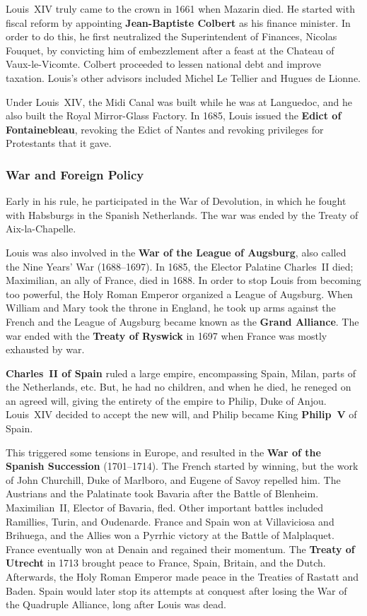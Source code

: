 Louis~XIV truly came to the crown in 1661 when Mazarin died.
He started with fiscal reform by appointing \textbf{Jean-Baptiste Colbert} as his finance minister.
In order to do this, he first neutralized the Superintendent of Finances, Nicolas Fouquet,
by convicting him of embezzlement after a feast at the Chateau of Vaux-le-Vicomte.
Colbert proceeded to lessen national debt and improve taxation.
Louis's other advisors included Michel Le Tellier and Hugues de Lionne.

Under Louis~XIV, the Midi Canal was built while he was at Languedoc,
and he also built the Royal Mirror-Glass Factory.
In 1685, Louis issued the \textbf{Edict of Fontainebleau},
revoking the Edict of Nantes and revoking privileges for Protestants that it gave.

\subsubsection*{War and Foreign Policy}

Early in his rule, he participated in the War of Devolution,
in which he fought with Habsburgs in the Spanish Netherlands.
The war was ended by the Treaty of Aix-la-Chapelle.

Louis was also involved in the \textbf{War of the League of Augsburg},
also called the Nine Years' War (1688--1697).
In 1685, the Elector Palatine Charles~II died; Maximilian, an ally of France, died in 1688.
In order to stop Louis from becoming too powerful, the Holy Roman Emperor organized a League of Augsburg.
When William and Mary took the throne in England,
he took up arms against the French and the League of Augsburg became known as the \textbf{Grand Alliance}.
The war ended with the \textbf{Treaty of Ryswick} in 1697 when France was mostly exhausted by war.

\textbf{Charles~II of Spain} ruled a large empire, encompassing Spain, Milan, parts of the Netherlands, etc.
But, he had no children, and when he died, he reneged on an agreed will,
giving the entirety of the empire to Philip, Duke of Anjou.
Louis~XIV decided to accept the new will, and Philip became King \textbf{Philip~V} of Spain.

This triggered some tensions in Europe, and resulted in the \textbf{War of the Spanish Succession} (1701--1714).
The French started by winning, but the work of John Churchill, Duke of Marlboro, and Eugene of Savoy repelled him.
The Austrians and the Palatinate took Bavaria after the Battle of Blenheim.
Maximilian~II, Elector of Bavaria, fled.
Other important battles included Ramillies, Turin, and Oudenarde.
France and Spain won at Villaviciosa and Brihuega,
and the Allies won a Pyrrhic victory at the Battle of Malplaquet.
France eventually won at Denain and regained their momentum.
The \textbf{Treaty of Utrecht} in 1713 brought peace to France, Spain, Britain, and the Dutch.
Afterwards, the Holy Roman Emperor made peace in the Treaties of Rastatt and Baden.
Spain would later stop its attempts at conquest after losing the War of the Quadruple Alliance,
long after Louis was dead.

